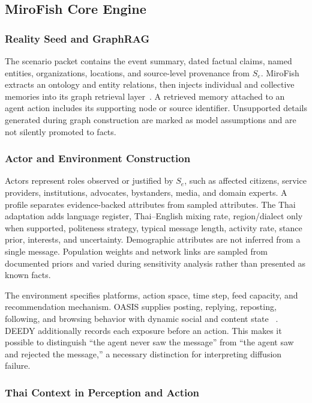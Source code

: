 \documentclass[conference]{IEEEtran}
\begin{document}
\subsection{MiroFish Core Engine}

\subsubsection{Reality Seed and GraphRAG}

The scenario packet contains the event summary, dated factual claims, named
entities, organizations, locations, and source-level provenance from $S_e$.
MiroFish extracts an ontology and entity relations, then injects individual and
collective memories into its graph retrieval layer~\cite{mirofish2026}. A
retrieved memory attached to an agent action includes its supporting node or
source identifier. Unsupported details generated during graph construction are
marked as model assumptions and are not silently promoted to facts.

\subsubsection{Actor and Environment Construction}

Actors represent roles observed or justified by $S_e$, such as affected
citizens, service providers, institutions, advocates, bystanders, media, and
domain experts. A profile separates evidence-backed attributes from sampled
attributes. The Thai adaptation adds language register, Thai--English mixing
rate, region/dialect only when supported, politeness strategy, typical message
length, activity rate, stance prior, interests, and uncertainty. Demographic
attributes are not inferred from a single message. Population weights and
network links are sampled from documented priors and varied during sensitivity
analysis rather than presented as known facts.

The environment specifies platforms, action space, time step, feed capacity,
and recommendation mechanism. OASIS supplies posting, replying, reposting,
following, and browsing behavior with dynamic social and content state
~\cite{yang2024oasis}. DEEDY additionally records each exposure before an
action. This makes it possible to distinguish ``the agent never saw the
message'' from ``the agent saw and rejected the message,'' a necessary
distinction for interpreting diffusion failure.

\subsubsection{Thai Context in Perception and Action}
\end{document}
